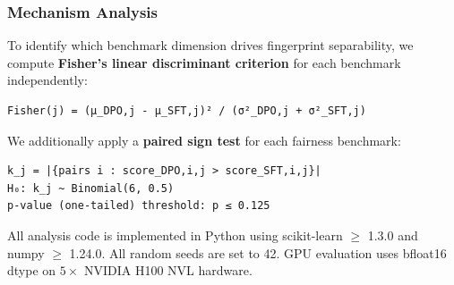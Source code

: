 \subsubsection{Mechanism Analysis}

To identify which benchmark dimension drives fingerprint separability, we compute
\textbf{Fisher's linear discriminant criterion} for each benchmark independently:

\begin{verbatim}
Fisher(j) = (μ_DPO,j - μ_SFT,j)² / (σ²_DPO,j + σ²_SFT,j)
\end{verbatim}

We additionally apply a \textbf{paired sign test} for each fairness benchmark:
\begin{verbatim}
k_j = |{pairs i : score_DPO,i,j > score_SFT,i,j}|
H₀: k_j ~ Binomial(6, 0.5)
p-value (one-tailed) threshold: p ≤ 0.125
\end{verbatim}

All analysis code is implemented in Python using scikit-learn $\geq$ 1.3.0 and numpy $\geq$ 1.24.0.
All random seeds are set to 42. GPU evaluation uses bfloat16 dtype on $5\times$ NVIDIA H100 NVL hardware.

